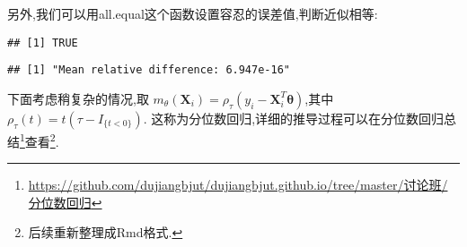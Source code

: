\documentclass[]{ctexbook}
\newenvironment{Shaded}{\begin{snugshade}}{\end{snugshade}}
\newcommand{\DataTypeTok}[1]{\textcolor[rgb]{0.13,0.29,0.53}{#1}}
\newcommand{\DecValTok}[1]{\textcolor[rgb]{0.00,0.00,0.81}{#1}}
\newcommand{\FloatTok}[1]{\textcolor[rgb]{0.00,0.00,0.81}{#1}}
\newcommand{\KeywordTok}[1]{\textcolor[rgb]{0.13,0.29,0.53}{\textbf{#1}}}
\newcommand{\NormalTok}[1]{#1}
\newcommand{\OperatorTok}[1]{\textcolor[rgb]{0.81,0.36,0.00}{\textbf{#1}}}
\renewcommand{\href}[2]{#2\footnote{\url{#1}}}
\begin{document}
另外,我们可以用all.equal这个函数设置容忍的误差值,判断近似相等:

\begin{Shaded}
\end{Shaded}

\begin{verbatim}
## [1] TRUE
\end{verbatim}

\begin{Shaded}
\end{Shaded}

\begin{verbatim}
## [1] "Mean relative difference: 6.947e-16"
\end{verbatim}

下面考虑稍复杂的情况,取
\(m_{\theta}\left(\boldsymbol{X}_{i}\right)=\rho_{\tau}\left(y_{i}-\boldsymbol{X}_{i}^{T} \boldsymbol{\theta}\right)\),其中
\(\rho_{\tau}(t)=t\left(\tau-I_{\{t<0\}}\right)\).
这称为分位数回归,详细的推导过程可以在\href{https://github.com/dujiangbjut/dujiangbjut.github.io/tree/master/讨论班/分位数回归}{分位数回归总结}查看\footnote{后续重新整理成Rmd格式.}.
\end{document}

